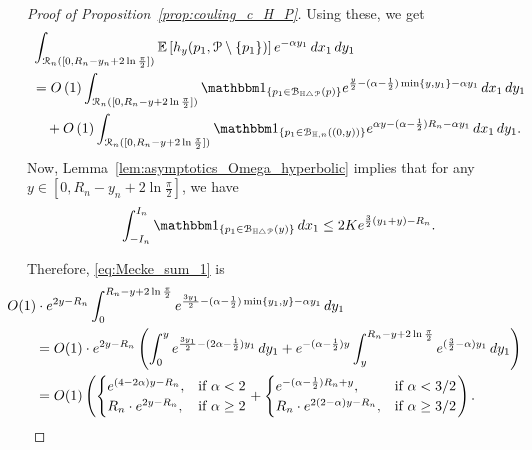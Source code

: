 \begin{proof}[Proof of Proposition~\ref{prop:couling_c_H_P}]
Using these, we get
\begin{align} 
	&\int_{\Rcal_n ([0, R_n - y_n + 2 \ln \frac{\pi}{2}])} \Exp{h_y(p_1, \Pcal \setminus \{p_1\})} 
    e^{-\alpha y_1} \, dx_1 \, dy_1 \notag \\
	&= \bigO{1} \int_{\Rcal_n ([0, R_n - y+ 2 \ln \frac{\pi}{2}])} \ind{p_1 \in \BallSym{p}} 
		e^{\frac{y}{2} - (\alpha - \frac{1}{2}) \min \{y,y_1\} - \alpha y_1} \, dx_1 \, dy_1
		\label{eq:Mecke_sum_1}\\ 
	&\hspace{10pt}+ \bigO{1} \int_{\Rcal_n ([0, R_n - y + 2 \ln \frac{\pi}{2}])} 
    	\ind{p_1 \in \BallHyp{(0,y)}} 
    	e^{\alpha y - (\alpha - \frac{1}{2})R_n - \alpha y_1} \, dx_1 \, dy_1.\label{eq:Mecke_sum_2}
\end{align}
Now, Lemma~\ref{lem:asymptotics_Omega_hyperbolic} implies that 
for any $y \in [0, R_n - y_n + 2 \ln \frac{\pi}{2}]$, we have 
\[ 
	\int_{-I_n}^{I_n} \ind{p_1 \in \BallSym{y}} \, dx_1 \leq 2 K e^{\frac{3}{2} (y_1 + y) - R_n}.
\]

Therefore, \eqref{eq:Mecke_sum_1} is 
\begin{align*}
	&\hspace{-20pt}O(1) \cdot e^{2 y - R_n} \int_{0}^{R_n - y + 2 \ln \frac{\pi}{2}} 
    	e^{\frac{3y_1}{2} - (\alpha - \frac{1}{2})\min\{y_1,y\} - \alpha y_1} \, dy_1 \\
 	&=  O(1) \cdot e^{2 y - R_n} \left( \int_{0}^{y} e^{\frac{3y_1}{2} - (2\alpha - \frac{1}{2})y_1} \, dy_1 
 		+ e^{-(\alpha-\frac{1}{2}) y}\int_{y}^{R_n - y + 2 \ln \frac{\pi}{2}} e^{(\frac{3}{2} - \alpha) y_1} \, dy_1 \right)\\
  	&= O(1) \left( 
	\begin{cases}
	e^{(4-2\alpha) y - R_n}, & \mbox{if $\alpha < 2$} \\
	R_n \cdot e^{2y - R_n}, & \mbox{if $\alpha \geq 2$}
	\end{cases}
	+
	\begin{cases}
	e^{-(\alpha - \frac{1}{2})R_n +y}, & \mbox{if $\alpha < 3/2$} \\
	R_n \cdot  e^{2(2-\alpha)y - R_n}, & \mbox{if $\alpha \geq 3/2$}
	\end{cases}\right).
\end{align*}


\end{proof}
